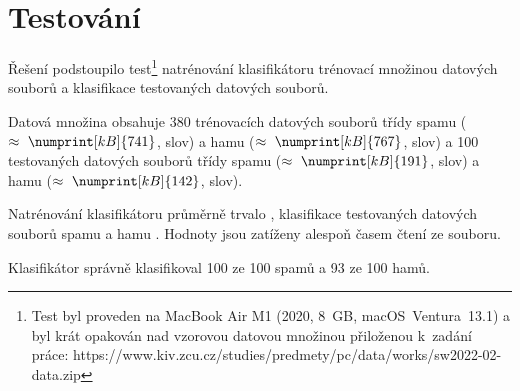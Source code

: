 \documentclass[a4paper, 12pt]{report}
\begin{document}
\section{Testování}

Řešení podstoupilo test\footnote{Test byl proveden na MacBook Air M1 
(2020, 8~GB, macOS~Ventura~13.1) a byl krát opakován nad 
vzorovou datovou množinou přiloženou k~zadání práce: 
https://www.kiv.zcu.cz/studies/predmety/pc/data/works/sw2022-02-data.zip} 
natrénování klasifikátoru trénovací množinou datových souborů a 
klasifikace testovaných datových souborů.

Datová množina obsahuje 380 trénovacích datových souborů třídy spamu
($\approx~\numprint[kB]{741}$,  slov) a hamu
($\approx~\numprint[kB]{767}$,  slov) a 
100 testovaných datových souborů třídy spamu
($\approx~\numprint[kB]{191}$,  slov) a hamu
($\approx~\numprint[kB]{142}$,  slov).

Natrénování klasifikátoru průměrně trvalo , 
klasifikace testovaných datových souborů spamu  a hamu 
. Hodnoty jsou zatíženy alespoň časem čtení ze souboru.

Klasifikátor správně klasifikoval 100 ze 100 spamů a 93 ze 100 hamů.
\end{document}
